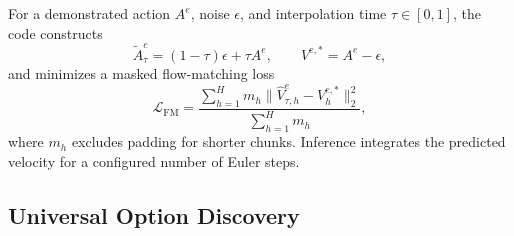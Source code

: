For a demonstrated action \(A^e\), noise \(\epsilon\), and interpolation time
\(\tau\in[0,1]\), the code constructs
\begin{equation}
    \widetilde A_\tau^e=(1-\tau)\epsilon+\tau A^e,\qquad
    V^{e,*}=A^e-\epsilon,
    \label{eq:flow-path}
\end{equation}
and minimizes a masked flow-matching loss
\begin{equation}
    \mathcal{L}_{\mathrm{FM}}
    =\frac{\sum_{h=1}^{H}m_h
      \|\widehat V_{\tau,h}^e-V_h^{e,*}\|_2^2}
      {\sum_{h=1}^{H}m_h},
    \label{eq:flow-loss}
\end{equation}
where \(m_h\) excludes padding for shorter chunks.  Inference integrates the
predicted velocity for a configured number of Euler steps.

\subsection{Universal Option Discovery}

